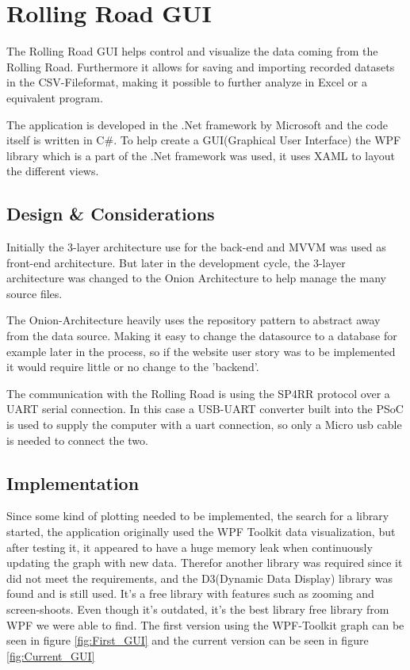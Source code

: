 \section{Rolling Road GUI}

The Rolling Road GUI helps control and visualize the data coming from the Rolling Road. Furthermore it allows for saving and importing recorded datasets in the CSV-Fileformat, making it possible to further analyze in Excel or a equivalent program.

The application is developed in the .Net framework by Microsoft and the code itself is written in C\#.
To help create a GUI(Graphical User Interface) the WPF library which is a part of the .Net framework was used, it uses XAML to layout the different views.

\subsection{Design \& Considerations}

Initially the 3-layer architecture use for the back-end and MVVM was used as front-end architecture. But later in the development cycle, the 3-layer architecture was changed to the Onion Architecture to help manage the many source files.


The Onion-Architecture heavily uses the repository pattern to abstract away from the data source. Making it easy to change the datasource to a database for example later in the process, so if the website user story was to be implemented it would require little or no change to the 'backend'.

The communication with the Rolling Road is using the SP4RR protocol over a UART serial connection. In this case a USB-UART converter built into the PSoC is used to supply the computer with a uart connection, so only a Micro usb cable is needed to connect the two.

\subsection{Implementation}

Since some kind of plotting needed to be implemented, the search for a library started, the application originally used the WPF Toolkit data visualization\cite{WPf_Toolkit}, but after testing it, it appeared to have a huge memory leak when continuously updating the graph with new data. Therefor another library was required since it did not meet the requirements, and the D3(Dynamic Data Display) library\cite{WPf_D3} was found and is still used. It's a free library with features such as zooming and screen-shoots. Even though it's outdated, it's the best library free library from WPF we were able to find. The first version using the WPF-Toolkit graph can be seen in figure \vref{fig:First_GUI} and the current version can be seen in figure \vref{fig:Current_GUI}


